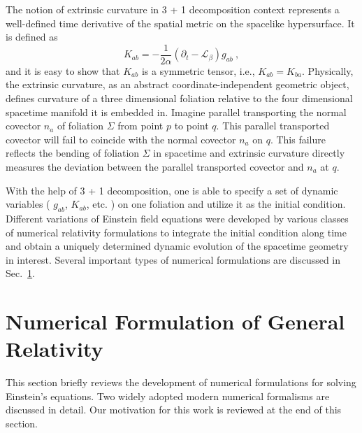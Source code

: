 The notion of extrinsic curvature in 3 + 1 decomposition context represents a well-defined time derivative of the spatial metric on the spacelike hypersurface. It is defined as
\begin{equation}\label{extrinsic}
K_{ab} = - \frac{1}{2\alpha}(\partial_{t} - \mathcal{L}_{\beta})g_{ab} \ ,
\end{equation}
and it is easy to show that $K_{ab}$ is a symmetric tensor, i.e., $K_{ab} = K_{ba}$. Physically, the extrinsic curvature, as an abstract coordinate-independent geometric object, defines curvature of a three dimensional foliation relative to the four dimensional spacetime manifold it is embedded in. Imagine parallel transporting the normal covector $n_{a}$ of foliation $\Sigma$ from point $p$ to point $q$. This parallel transported covector will fail to coincide with the normal covector $n_{a}$ on $q$. This failure reflects the bending of foliation $\Sigma$ in spacetime and extrinsic curvature directly measures the deviation between the parallel transported covector and $n_{a}$ at $q$. 

With the help of 3 + 1 decomposition, one is able to specify a set of dynamic variables ( $g_{ab}$, $K_{ab}$, etc. ) on one foliation and utilize it as the initial condition. Different variations of Einstein field equations were developed by various classes of numerical relativity formulations to integrate the initial condition along time and obtain a uniquely determined dynamic evolution of the spacetime geometry in interest. Several important types of  numerical formulations are discussed in Sec.~\ref{numericalformulation}.  

\section{Numerical Formulation of General Relativity}\label{numericalformulation}
This section briefly reviews the development of numerical formulations for solving Einstein's equations. Two widely adopted modern numerical formalisms are discussed in detail. Our motivation for this work is reviewed at the end of this section. 

